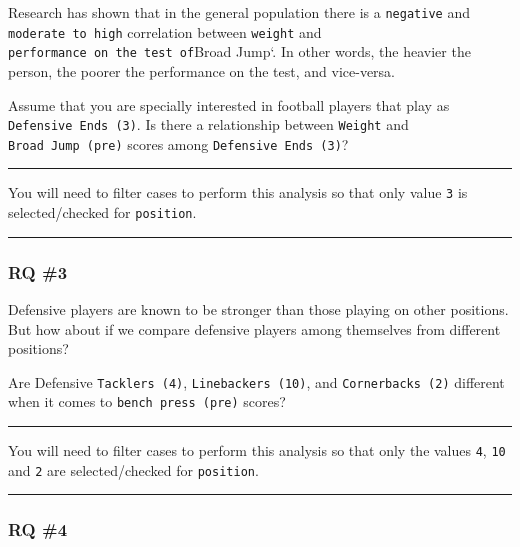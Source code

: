 \documentclass[
]{article}
\begin{document}
Research has shown that in the general population there is a \texttt{negative} and \texttt{moderate\ to\ high} correlation between \texttt{weight} and \texttt{performance\ on\ the\ test\ of}Broad Jump`. In other words, the heavier the person, the poorer the performance on the test, and vice-versa.

Assume that you are specially interested in football players that play as \texttt{Defensive\ Ends\ (3)}. Is there a relationship between \texttt{Weight} and \texttt{Broad\ Jump\ (pre)} scores among \texttt{Defensive\ Ends\ (3)}?

\begin{center}\rule{0.5\linewidth}{0.5pt}\end{center}

You will need to filter cases to perform this analysis so that only value \texttt{3} is selected/checked for \texttt{position}.

\begin{center}\rule{0.5\linewidth}{0.5pt}\end{center}

\hypertarget{rq-3}{%
\subsubsection{RQ \#3}\label{rq-3}}

Defensive players are known to be stronger than those playing on other positions. But how about if we compare defensive players among themselves from different positions?

Are Defensive \texttt{Tacklers\ (4)}, \texttt{Linebackers\ (10)}, and \texttt{Cornerbacks\ (2)} different when it comes to \texttt{bench\ press\ (pre)} scores?

\begin{center}\rule{0.5\linewidth}{0.5pt}\end{center}

You will need to filter cases to perform this analysis so that only the values \texttt{4}, \texttt{10} and \texttt{2} are selected/checked for \texttt{position}.

\begin{center}\rule{0.5\linewidth}{0.5pt}\end{center}

\hypertarget{rq-4}{%
\subsubsection{RQ \#4}\label{rq-4}}
\end{document}

